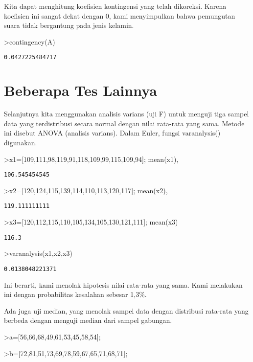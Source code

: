\documentclass[
]{book}
\begin{document}
Kita dapat menghitung koefisien kontingensi yang telah dikoreksi. Karena koefisien ini sangat dekat dengan 0, kami menyimpulkan bahwa pemungutan suara tidak bergantung pada jenis kelamin.

\textgreater contingency(A)

\begin{verbatim}
0.0427225484717
\end{verbatim}

\section{Beberapa Tes Lainnya}\label{beberapa-tes-lainnya}

Selanjutnya kita menggunakan analisis varians (uji F) untuk menguji tiga sampel data yang terdistribusi secara normal dengan nilai rata-rata yang sama. Metode ini disebut ANOVA (analisis varians). Dalam Euler, fungsi varanalysis() digunakan.

\textgreater x1={[}109,111,98,119,91,118,109,99,115,109,94{]}; mean(x1),

\begin{verbatim}
106.545454545
\end{verbatim}

\textgreater x2={[}120,124,115,139,114,110,113,120,117{]}; mean(x2),

\begin{verbatim}
119.111111111
\end{verbatim}

\textgreater x3={[}120,112,115,110,105,134,105,130,121,111{]}; mean(x3)

\begin{verbatim}
116.3
\end{verbatim}

\textgreater varanalysis(x1,x2,x3)

\begin{verbatim}
0.0138048221371
\end{verbatim}

Ini berarti, kami menolak hipotesis nilai rata-rata yang sama. Kami melakukan ini dengan probabilitas kesalahan sebesar 1,3\%.

Ada juga uji median, yang menolak sampel data dengan distribusi rata-rata yang berbeda dengan menguji median dari sampel gabungan.

\textgreater a={[}56,66,68,49,61,53,45,58,54{]};

\textgreater b={[}72,81,51,73,69,78,59,67,65,71,68,71{]};
\end{document}
